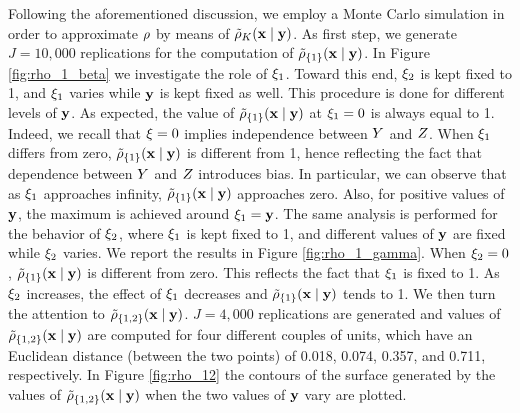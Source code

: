 Following the aforementioned discussion, we employ a Monte Carlo simulation in order to approximate $\rho$ by means of $\tilde{\rho}_{K}(\mathbf{x}\mid\mathbf{y})$. As first step, we generate $J=10,000$ replications for the computation of $\tilde{\rho}_{\lbrace 1\rbrace}(\mathbf{x}\mid\mathbf{y})$. In Figure \ref{fig:rho_1_beta} we investigate the role of $\xi_{1}$. Toward this end, $\xi_{2}$ is kept fixed to 1, and $\xi_{1}$ varies while $\mathbf{y}$ is kept fixed as well. This procedure is done for different levels of $\mathbf{y}$. As expected, the value of $\tilde{\rho}_{\lbrace 1\rbrace}(\mathbf{x}\mid\mathbf{y})$ at $\xi_{1}=0$ is always equal to 1. Indeed, we recall that $\xi=0$ implies independence between $Y$ and $Z$. When $\xi_{1}$ differs from zero, $\tilde{\rho}_{\lbrace 1\rbrace}(\mathbf{x}\mid\mathbf{y})$ is different from 1, hence reflecting the fact that dependence between $Y$ and $Z$ introduces bias. In particular, we can observe that as $\xi_{1}$ approaches infinity, $\tilde{\rho}_{\lbrace1\rbrace}(\mathbf{x}\mid\mathbf{y})$ approaches zero. Also, for positive values of $\mathbf{y}$, the maximum is achieved around $\xi_{1}=\mathbf{y}$. The same analysis is performed for the behavior of $\xi_{2}$, where $\xi_{1}$ is kept fixed to 1, and different values of $\mathbf{y}$ are fixed while $\xi_{2}$ varies. We report the results in Figure \ref{fig:rho_1_gamma}. When $\xi_{2}=0$, $\tilde{\rho}_{\lbrace 1\rbrace}(\mathbf{x}\mid\mathbf{y})$ is different from zero. This reflects the fact that $\xi_{1}$ is fixed to 1. As $\xi_{2}$ increases, the effect of $\xi_{1}$ decreases and $\tilde{\rho}_{\lbrace 1\rbrace}(\mathbf{x}\mid\mathbf{y})$ tends to 1. We then turn the attention to $\tilde{\rho}_{\lbrace 1,2\rbrace}(\mathbf{x}\mid\mathbf{y})$. $J=4,000$  replications are generated and values of $\tilde{\rho}_{\lbrace 1,2\rbrace}(\mathbf{x}\mid\mathbf{y})$ are computed for four different couples of units, which have an Euclidean distance (between the two points) of 0.018, 0.074, 0.357, and 0.711, respectively. In Figure \ref{fig:rho_12} the contours of the surface generated by the values of $\tilde{\rho}_{\lbrace 1,2\rbrace}(\mathbf{x}\mid\mathbf{y})$ when the two values of $\mathbf{y}$ vary are plotted.


